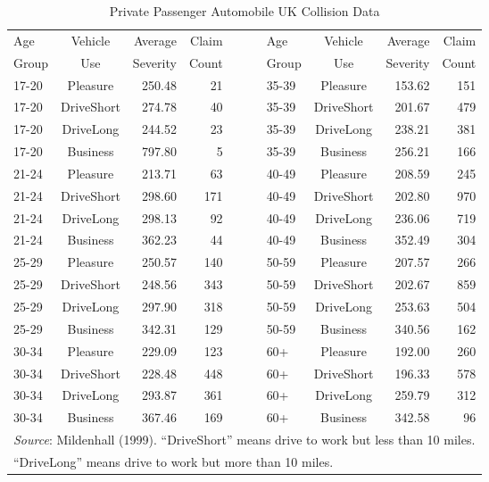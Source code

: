 \begin{table}[h]
 \caption{\label{T13:PrivateCollision} Private
Passenger Automobile UK Collision Data}
\begin{tabular}{lcrr|llcrr}
 \hline
       Age &   Vehicle  &    Average &      Claim &~~~ &       Age &   Vehicle  &    Average &      Claim \\
     Group &        Use &   Severity &      Count & &     Group &        Use &   Severity &      Count \\
     \hline
     17-20 &   Pleasure &     250.48 &         21 &  &     35-39 &   Pleasure &     153.62 &        151 \\
     17-20 & DriveShort &     274.78 &         40 & &      35-39 & DriveShort &     201.67 &        479 \\
     17-20 &  DriveLong &     244.52 &         23 & &      35-39 &  DriveLong &     238.21 &        381 \\
     17-20 &   Business &     797.80 &          5 & &      35-39 &   Business &     256.21 &        166 \\
 \hline
     21-24 &   Pleasure &     213.71 &         63 & &      40-49 &   Pleasure &     208.59 &        245 \\
     21-24 & DriveShort &     298.60 &        171 & &      40-49 & DriveShort &     202.80 &        970 \\
     21-24 &  DriveLong &     298.13 &         92 & &      40-49 &  DriveLong &     236.06 &        719 \\
     21-24 &   Business &     362.23 &         44 & &     40-49 &   Business &     352.49 &        304 \\
 \hline
     25-29 &   Pleasure &     250.57 &        140 & &      50-59 &   Pleasure &     207.57 &        266 \\
     25-29 & DriveShort &     248.56 &        343 & &      50-59 & DriveShort &     202.67 &        859 \\
     25-29 &  DriveLong &     297.90 &        318 & &      50-59 &  DriveLong &     253.63 &        504 \\
     25-29 &   Business &     342.31 &        129 &  &     50-59 &   Business &     340.56 &        162 \\
 \hline
     30-34 &   Pleasure &     229.09 &        123 & &        60+ &   Pleasure &     192.00 &        260 \\
     30-34 & DriveShort &     228.48 &        448 & &        60+ & DriveShort &     196.33 &        578 \\
     30-34 &  DriveLong &     293.87 &        361 & &        60+ &  DriveLong &     259.79 &        312 \\
     30-34 &   Business &     367.46 &        169 & &        60+ &   Business &     342.58 &         96 \\
 \hline
 \multicolumn{9}{l}{\textit{Source}: Mildenhall (1999). ``DriveShort'' means drive to work but less than 10
 miles.} \\
  \multicolumn{9}{l}{``DriveLong'' means drive to work but more than 10 miles.}
\end{tabular}
\linetjed {}
\end{table}



